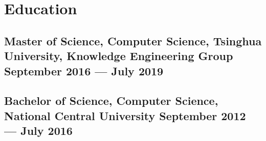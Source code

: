 \section{Education}
\subsection*{Master of Science, Computer Science, {\normalsize \normalfont Tsinghua University, Knowledge Engineering Group} \hfill September 2016 --- July 2019} 
\vspace{0.1cm}
\subsection*{Bachelor of Science, Computer Science, {\normalsize \normalfont National Central University} \hfill September 2012 --- July 2016} 
\vspace{0.2cm}